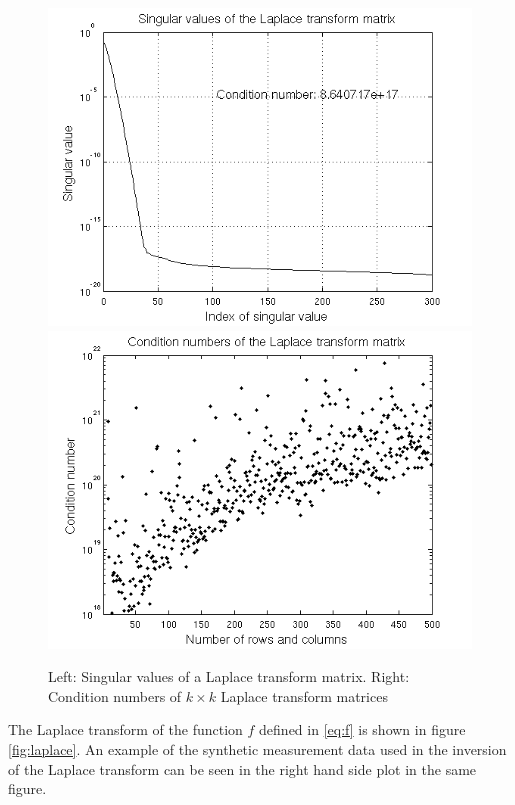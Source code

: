 \documentclass[12pt,a4]{article}
\begin{document}
\begin{figure}[t]
\begin{center}
\includegraphics[scale=.4]{img/singular.png}
\includegraphics[scale=.4]{img/cond.png}
\end{center}
\caption{Left: Singular values of a Laplace transform matrix. Right: Condition numbers of $k \times k$ Laplace transform matrices}
\label{fig:singular}
\end{figure}

The Laplace transform of the function $f$ defined in \eqref{eq:f} is shown in figure \ref{fig:laplace}. An example of the synthetic measurement data used in the inversion of the Laplace transform can be seen in the right hand side plot in the same figure.
\end{document}
